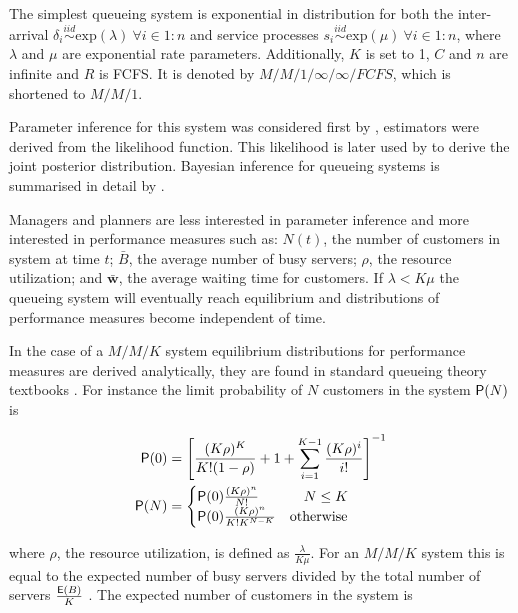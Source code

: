 \documentclass[article]{jss}
\begin{document}
The simplest queueing system is exponential in distribution for both the inter-arrival $\delta_i \overset{iid}{\sim} \mathrm{exp}(\lambda) ~ \forall i \in 1:n$ and service processes $s_i \overset{iid}{\sim} \mathrm{exp}(\mu) ~ \forall i \in 1:n$, where $\lambda$ and $\mu$ are exponential rate parameters. Additionally, $K$ is set to 1, $C$ and $n$ are infinite and $R$ is FCFS. It is denoted by $M/M/1/ \infty / \infty / FCFS$, which is shortened to $M/M/1$. 

Parameter inference for this system was considered first by \citet{clarke1957maximum}, estimators were derived from the likelihood function. This likelihood is later used by \citet{muddapur1972bayesian} to derive the joint posterior distribution. Bayesian inference for queueing systems is summarised in detail by \citet{insua2012bayesian}. 

Managers and planners are less interested in parameter inference and more interested in performance measures such as: $N(t)$, the number of customers in system at time $t$; $\bar{B}$, the average number of busy servers; $\rho$, the resource utilization; and $\bar{\mathbf{w}}$, the average waiting time for customers. If $\lambda < K \mu$ the queueing system will eventually reach equilibrium and distributions of performance measures become independent of time. 

In the case of a $M/M/K$ system equilibrium distributions for performance measures are derived analytically, they are found in standard queueing theory textbooks \citep{lipsky2008queueing, thomopoulos2012fundamentals}. For instance the limit probability of $N$ customers in the system $\mathsf{P}(N)$  is

\begin{align}
\mathsf{P}(0) &= \left[\frac{ (K \rho)^K}{K! (1 - \rho)} + 1 + \sum_{i=1}^{K-1} \frac{(K \rho)^i}{i!}   \right]^{-1} \nonumber \\
\mathsf{P}(N) &= \begin{cases} 
\mathsf{P}(0) \frac{(K \rho)^n }{N!} & \quad  N \leq K\\
\mathsf{P}(0) \frac{(K \rho)^n }{K! K^{N-K}} & \text{otherwise} 
\end{cases} \label{eq:pn}
\end{align}

where $\rho$, the resource utilization, is defined as $\frac{\lambda}{K \mu}$. For an $M/M/K$ system this is equal to the expected number of busy servers divided by the total number of servers $\frac{\mathsf{E}(B)}{K}$ \citep[pg. 451]{cassandras2009introduction}. The expected number of customers in the system is \citep{bhat2015introduction}  
\end{document}
